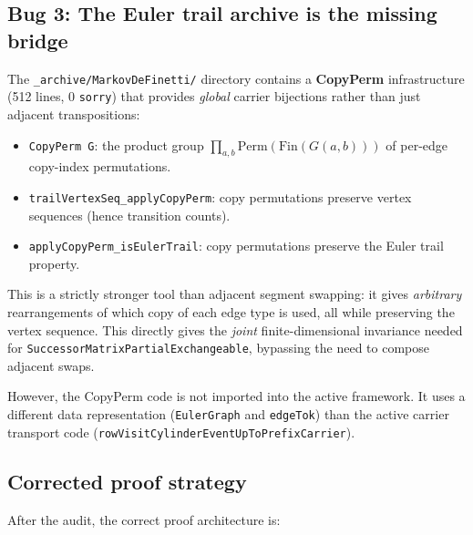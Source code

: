 \documentclass[11pt]{article}
\theoremstyle{definition}
\newcommand{\Fin}{\mathrm{Fin}}
\newcommand{\lean}[1]{\texttt{#1}}
\begin{document}
\subsection{Bug 3: The Euler trail archive is the missing bridge}
\label{sec:bug3}

The \texttt{\_archive/MarkovDeFinetti/} directory contains a
\textbf{CopyPerm} infrastructure (512 lines, 0 \texttt{sorry})
that provides \emph{global} carrier bijections rather than just
adjacent transpositions:

\begin{itemize}[leftmargin=2em]
\item \lean{CopyPerm G}: the product group
  $\prod_{a,b} \mathrm{Perm}(\Fin(G(a,b)))$
  of per-edge copy-index permutations.
\item \lean{trailVertexSeq\_applyCopyPerm}: copy permutations preserve
  vertex sequences (hence transition counts).
\item \lean{applyCopyPerm\_isEulerTrail}: copy permutations preserve
  the Euler trail property.
\end{itemize}

This is a strictly stronger tool than adjacent segment swapping:
it gives \emph{arbitrary} rearrangements of which copy of each
edge type is used, all while preserving the vertex sequence.  This
directly gives the \emph{joint} finite-dimensional invariance
needed for \lean{SuccessorMatrixPartialExchangeable}, bypassing the
need to compose adjacent swaps.

However, the CopyPerm code is not imported into the active framework.
It uses a different data representation (\lean{EulerGraph} and
\lean{edgeTok}) than the active carrier transport code
(\lean{rowVisitCylinderEventUpToPrefixCarrier}).

\subsection{Corrected proof strategy}
\label{sec:corrected}

After the audit, the correct proof architecture is:
\end{document}
